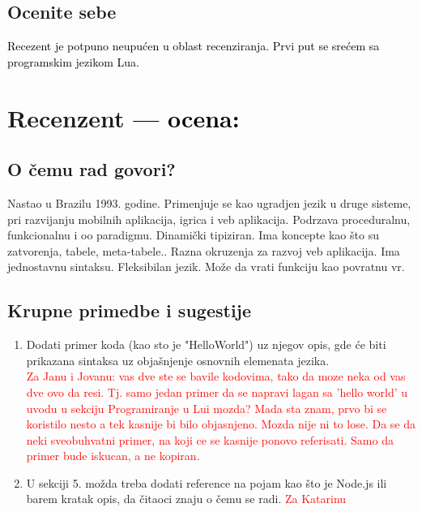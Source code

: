\documentclass[a4paper]{report}
\newcommand{\odgovor}[1]{\textcolor{black}{#1}}
\newcommand{\note}[1]{\textcolor{red}{#1}}
\begin{document}
\section{Ocenite sebe}
\odgovor{
Recezent je potpuno neupućen u oblast recenziranja. Prvi put se srećem sa programskim jezikom Lua. 
}
\chapter{Recenzent \odgovor{--- ocena:} }


\section{O čemu rad govori?}

Nastao u Brazilu 1993. godine. Primenjuje se kao ugradjen jezik u druge sisteme, pri razvijanju mobilnih aplikacija, igrica i veb aplikacija. Podrzava proceduralnu, funkcionalnu i oo paradigmu. Dinami\v cki tipiziran. Ima koncepte kao \v sto su zatvorenja, tabele, meta-tabele.. Razna okruzenja za razvoj veb aplikacija. Ima jednostavnu sintaksu. Fleksibilan jezik. Mo\v ze da vrati funkciju kao povratnu vr.

\section{Krupne primedbe i sugestije}
  
  \begin{enumerate}
    \item  Dodati primer koda (kao sto je "HelloWorld") uz njegov opis, gde \' ce biti prikazana sintaksa uz obja\v snjenje osnovnih elemenata jezika. \\
\note{Za Janu i Jovanu: vas dve ste se bavile kodovima, tako da moze neka od vas dve ovo da resi. Tj. samo jedan primer da se napravi lagan sa 'hello world' u uvodu u sekciju Programiranje u Lui mozda? Mada sta znam, prvo bi se koristilo nesto a tek kasnije bi bilo objasnjeno. Mozda nije ni to lose. Da se da neki sveobuhvatni primer, na koji ce se kasnije ponovo referisati. Samo da primer bude iskucan, a ne kopiran.}
    \item U sekciji 5. mo\v zda treba dodati reference na pojam kao \v sto je Node.js ili barem kratak opis, da \v citaoci znaju o \v cemu se radi. \note{Za Katarinu}
  \end{enumerate}
\end{document}
